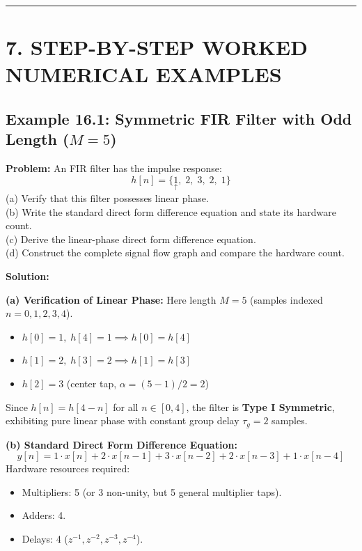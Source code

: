 \documentclass[11pt,a4paper]{article}
\begin{document}
\noindent\rule{\textwidth}{0.5pt}

\section{7. STEP-BY-STEP WORKED NUMERICAL EXAMPLES}

\subsection{\texorpdfstring{Example 16.1: Symmetric FIR Filter with Odd Length ($M=5$)}{Example 16.1: Symmetric FIR Filter with Odd Length (M=5)}}
\textbf{Problem:} An FIR filter has the impulse response:
\begin{equation}
h[n] = \{ \underset{\uparrow}{1}, \; 2, \; 3, \; 2, \; 1 \}
\end{equation}
(a) Verify that this filter possesses linear phase. \\
(b) Write the standard direct form difference equation and state its hardware count. \\
(c) Derive the linear-phase direct form difference equation. \\
(d) Construct the complete signal flow graph and compare the hardware count.

\vspace{0.3cm}
\noindent\textbf{Solution:}

\noindent\textbf{(a) Verification of Linear Phase:}
Here length $M = 5$ (samples indexed $n = 0, 1, 2, 3, 4$).
\begin{itemize}
    \item $h[0] = 1, \; h[4] = 1 \implies h[0] = h[4]$
    \item $h[1] = 2, \; h[3] = 2 \implies h[1] = h[3]$
    \item $h[2] = 3$ (center tap, $\alpha = (5-1)/2 = 2$)
\end{itemize}
Since $h[n] = h[4-n]$ for all $n \in [0, 4]$, the filter is \textbf{Type I Symmetric}, exhibiting pure linear phase with constant group delay $\tau_g = 2$ samples.

\vspace{0.2cm}
\noindent\textbf{(b) Standard Direct Form Difference Equation:}
\begin{equation}
y[n] = 1 \cdot x[n] + 2 \cdot x[n-1] + 3 \cdot x[n-2] + 2 \cdot x[n-3] + 1 \cdot x[n-4]
\end{equation}
Hardware resources required:
\begin{itemize}
    \item Multipliers: 5 (or 3 non-unity, but 5 general multiplier taps).
    \item Adders: 4.
    \item Delays: 4 ($z^{-1}, z^{-2}, z^{-3}, z^{-4}$).
\end{itemize}
\end{document}
